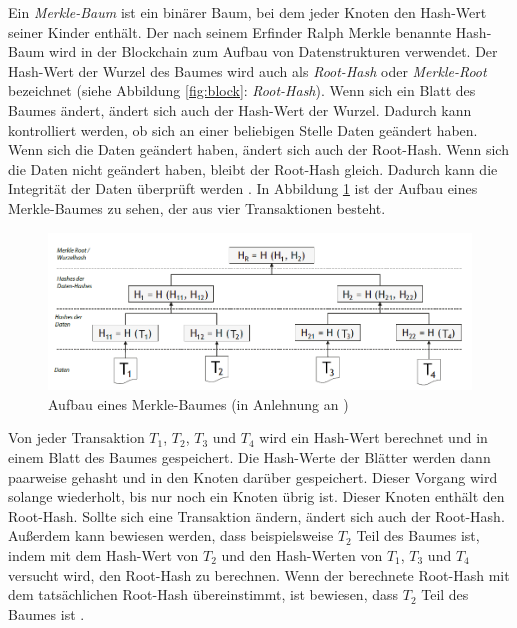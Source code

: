 Ein \textit{Merkle-Baum} ist ein binärer Baum, bei dem jeder Knoten den Hash-Wert seiner Kinder enthält. Der nach seinem Erfinder Ralph Merkle benannte Hash-Baum wird in der Blockchain zum Aufbau von Datenstrukturen verwendet. Der Hash-Wert der Wurzel des Baumes wird auch als \textit{Root-Hash} oder \textit{Merkle-Root} bezeichnet (siehe Abbildung \ref{fig:block}: \textit{Root-Hash}). Wenn sich ein Blatt des Baumes ändert, ändert sich auch der Hash-Wert der Wurzel. Dadurch kann kontrolliert werden, ob sich an einer beliebigen Stelle Daten geändert haben. Wenn sich die Daten geändert haben, ändert sich auch der Root-Hash. Wenn sich die Daten nicht geändert haben, bleibt der Root-Hash gleich. Dadurch kann die Integrität der Daten überprüft werden \parencite[S. 7-8]{Fill_BlockchainGrundlagen}. In Abbildung \ref{fig:merkle_tree} ist der Aufbau eines Merkle-Baumes zu sehen, der aus vier Transaktionen besteht.

\begin{figure}[H]
    \centering
    \includegraphics[width=0.9\linewidth]{images/merkle_tree_modified.png}
    \caption{Aufbau eines Merkle-Baumes (in Anlehnung an \cite[S. 8]{Fill_BlockchainGrundlagen})}
    \label{fig:merkle_tree}
\end{figure}

\noindent Von jeder Transaktion $T_{1}$, $T_{2}$, $T_{3}$ und $T_{4}$ wird ein Hash-Wert berechnet und in einem Blatt des Baumes gespeichert. Die Hash-Werte der Blätter werden dann paarweise gehasht und in den Knoten darüber gespeichert. Dieser Vorgang wird solange wiederholt, bis nur noch ein Knoten übrig ist. Dieser Knoten enthält den Root-Hash. Sollte sich eine Transaktion ändern, ändert sich auch der Root-Hash. Außerdem kann bewiesen werden, dass beispielsweise $T_{2}$ Teil des Baumes ist, indem mit dem Hash-Wert von $T_{2}$ und den Hash-Werten von $T_{1}$, $T_{3}$ und $T_{4}$ versucht wird, den Root-Hash zu berechnen. Wenn der berechnete Root-Hash mit dem tatsächlichen Root-Hash übereinstimmt, ist bewiesen, dass $T_{2}$ Teil des Baumes ist \parencite[S. 9]{Fill_BlockchainGrundlagen}.


